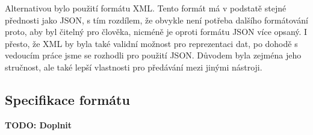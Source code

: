 			Alternativou bylo použití formátu XML. Tento formát má v podstatě stejné přednosti jako JSON, s tím rozdílem, že obvykle není potřeba dalšího formátování proto, aby byl čitelný pro člověka, nicméně je oproti formátu JSON více opsaný. I přesto, že XML by byla také validní možnost pro reprezentaci dat, po dohodě s vedoucím práce jsme se rozhodli pro použití JSON. Důvodem byla zejména jeho stručnost, ale také lepší vlastnosti pro předávání mezi jinými nástroji.
			
			\subsection{Specifikace formátu}
				\textbf{\textcolor{pblue}{TODO: Doplnit}}\\